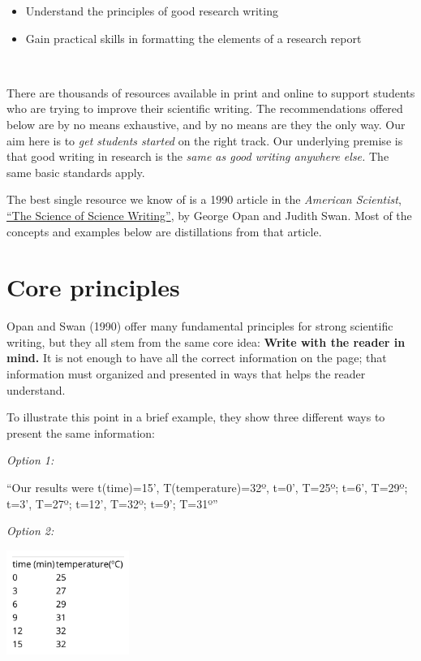\documentclass[
]{book}
\providecommand{\tightlist}{%
  \setlength{\itemsep}{0pt}\setlength{\parskip}{0pt}}
\begin{document}
\begin{itemize}
\tightlist
\item
  Understand the principles of good research writing
\item
  Gain practical skills in formatting the elements of a research report
\end{itemize}

~

There are thousands of resources available in print and online to support students who are trying to improve their scientific writing. The recommendations offered below are by no means exhaustive, and by no means are they the only way. Our aim here is to \emph{get students started} on the right track. Our underlying premise is that good writing in research is the \emph{same as good writing anywhere else.} The same basic standards apply.

The best single resource we know of is a 1990 article in the \emph{American Scientist}, \href{https://www.americanscientist.org/blog/the-long-view/the-science-of-scientific-writing}{``The Science of Science Writing''}, by George Opan and Judith Swan. Most of the concepts and examples below are distillations from that article.

\hypertarget{core-principles}{%
\section*{Core principles}\label{core-principles}}

Opan and Swan (1990) offer many fundamental principles for strong scientific writing, but they all stem from the same core idea: \textbf{Write with the reader in mind.} It is not enough to have all the correct information on the page; that information must organized and presented in ways that helps the reader understand.

To illustrate this point in a brief example, they show three different ways to present the same information:

\emph{Option 1:}

``Our results were t(time)=15', T(temperature)=32º, t=0', T=25º; t=6', T=29º; t=3', T=27º; t=12', T=32º; t=9'; T=31º''

\emph{Option 2:}

\includegraphics[width=0.3\textwidth,height=\textheight]{img/style-eg1.png}
\end{document}
